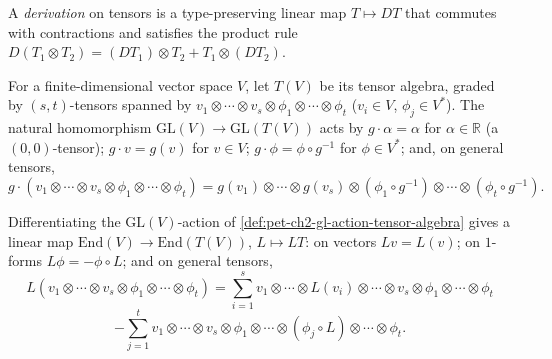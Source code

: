 \begin{definition}
  \label{def:pet-ch2-tensor-derivation}


  A \emph{derivation} on tensors is a type-preserving linear map
  $T\mapsto DT$ that commutes with contractions and satisfies the product rule
  $D(T_1\otimes T_2)=(DT_1)\otimes T_2+T_1\otimes(DT_2)$.
\end{definition}

\begin{definition}
  \label{def:pet-ch2-gl-action-tensor-algebra}


  For a finite-dimensional vector space $V$, let $T(V)$ be its tensor algebra,
  graded by $(s,t)$-tensors spanned by
  $v_1\otimes\cdots\otimes v_s\otimes\phi_1\otimes\cdots\otimes\phi_t$
  ($v_i\in V$, $\phi_j\in V^*$). The natural homomorphism
  $\mathrm{GL}(V)\to\mathrm{GL}(T(V))$ acts by $g\cdot\alpha=\alpha$ for
  $\alpha\in\mathbb{R}$ (a $(0,0)$-tensor); $g\cdot v=g(v)$ for $v\in V$;
  $g\cdot\phi=\phi\circ g^{-1}$ for $\phi\in V^*$; and, on general tensors,
  \[
    g\cdot(v_1\otimes\cdots\otimes v_s\otimes\phi_1\otimes\cdots\otimes\phi_t)
    = g(v_1)\otimes\cdots\otimes g(v_s)\otimes(\phi_1\circ g^{-1})\otimes\cdots\otimes(\phi_t\circ g^{-1}).
  \]
\end{definition}

\begin{definition}
  \label{def:pet-ch2-endomorphism-derivation}


  Differentiating the $\mathrm{GL}(V)$-action of
  \cref{def:pet-ch2-gl-action-tensor-algebra} gives a linear map
  $\mathrm{End}(V)\to\mathrm{End}(T(V))$, $L\mapsto LT$: on vectors $Lv=L(v)$;
  on $1$-forms $L\phi=-\phi\circ L$; and on general tensors,
  \[
    L(v_1\otimes\cdots\otimes v_s\otimes\phi_1\otimes\cdots\otimes\phi_t)
    = \sum_{i=1}^sv_1\otimes\cdots\otimes L(v_i)\otimes\cdots\otimes v_s\otimes\phi_1\otimes\cdots\otimes\phi_t
  \]
  \[
    -\sum_{j=1}^tv_1\otimes\cdots\otimes v_s\otimes\phi_1\otimes\cdots\otimes(\phi_j\circ L)\otimes\cdots\otimes\phi_t.
  \]
\end{definition}

